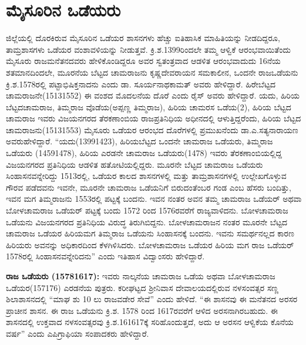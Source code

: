 \section*{ಮೈಸೂರಿನ ಒಡೆಯರು}

ಜಿಲ್ಲೆಯಲ್ಲಿ ದೊರಕಿರುವ ಮೈಸೂರಿನ ಒಡೆಯರ ಶಾಸನಗಳು ಹೆಚ್ಚು ಐತಿಹಾಸಿಕ ಮಾಹಿತಿಯನ್ನು ನೀಡದಿದ್ದರೂ, ತಾಮ್ರಶಾಸಗಳು ಒಡೆಯರ ವಂಶಾವಳಿಯನ್ನು ನೀಡುತ್ತವೆ. ಕ್ರಿ.ಶ.1399ರಿಂದಲೇ ತಮ್ಮ ಆಳ್ವಿಕೆ ಆರಂಭವಾಯಿತೆಂದು ಮೈಸೂರು ರಾಜಮನೆತನ\-ದವರು ಹೇಳಿಕೊಂಡಿದ್ದರೂ ಅವರ ಸ್ವತಂತ್ರವಾದ ಆಡಳಿತ ಆರಂಭವಾದುದು 16ನೆಯ ಶತಮಾನದಿಂದಲೇ, ಮೂರನೆಯ ಬೆಟ್ಟದ ಚಾಮರಾಜನು ಕೃಷ್ಣದೇವರಾಯನ ಸಮಕಾಲೀನ, ಒಂದನೇ ರಾಜಒಡೆಯನು ಕ್ರಿ.ಶ.1578ರಲ್ಲಿ ಪಟ್ಟಾಭಿಷಿಕ್ತನಾದನು ಎಂದು ಡಾ. ಸೂರ್ಯನಾಥಕಾಮತ್​ ಅವರು ಹೇಳಿದ್ದಾರೆ. ಹಿರೇಬೆಟ್ಟದ ಚಾಮರಾಜನೇ(1513\enginline{-}1552) ಈ ವಂಶದ ಮೊದಲನೆಯ ದೊರೆ ಎಂದು ರೈಸ್​ ಅವರು ಹೇಳಿದ್ದಾರೆ. ಯದು, ಹಿರಿಯ ಬೆಟ್ಟದಚಾಮರಾಜ, ತಿಮ್ಮರಾಜ ವೊಡೆಯ(ಅಪ್ಪಣ್ಣ ತಿಮ್ಮರಾಜ), ಹಿರಿಯ ಚಾಮರಸ ಒಡೆಯ(2), ಹಿರಿಯ ಬೆಟ್ಟದ ಚಾಮರಾಜ ಇವರು ವಿಜಯನಗರದ ತೆರಕಣಾಂಬಿಯ ರಾಜಪ್ರತಿನಿಧಿಯ ಅಧೀನದಲ್ಲಿ ಆಳುತ್ತಿದ್ದರೆಂದು, ಹಿರಿಯ ಬೆಟ್ಟದ ಚಾಮರಾಜನು\break (1513\enginline{-}1553) ಮೈಸೂರು ಒಡೆಯರ ಆರಂಭದ ದೊರೆಗಳಲ್ಲಿ ಪ್ರಮುಖನೆಂದು ಡಾ.ಎ.ಸತ್ಯನಾರಾಯಣ ಅವರು\break ಹೇಳಿದ್ದಾರೆ. “ಯದು(1399\enginline{-}1423), ಹಿರಿಯಬೆಟ್ಟದ ಒಂದನೇ ಚಾಮರಾಜ ಒಡೆಯರು, ತಿಮ್ಮರಾಜ ಒಡೆಯರು (1459\enginline{-}1478), ಹಿರಿಯ ಎರಡನೇ ಚಾಮರಾಜ ಒಡೆಯರು(1478) ಇವರು ತೆರಕಣಾಂಬಿಯಲ್ಲಿದ್ದ ವಿಜಯನಗರದ ಪ್ರತಿನಿಧಿಯ ಆಡಳಿತ ಹತೋಟಿಯಲ್ಲಿದ್ದರು. ಮೂರನೇ ಬೆಟ್ಟದ ಚಾಮರಾಜ ಒಡೆಯರು ಸಿಂಹಾಸನವನ್ನೇರಿದ್ದು 1513ರಲ್ಲಿ, ಒಡೆಯರ ಕಾಲದ ಶಾಸನಗಳಲ್ಲಿ ಮತ್ತು ತಾಮ್ರಶಾಸನಗಳಲ್ಲಿ ಉಲ್ಲೇಖಗೊಳ್ಳುವ ಗೌರವ ಪಡೆದವನು ಇವನೇ, ಮೂರನೇ ಚಾಮರಾಜ ಒಡೆಯನಿಗೆ ಬಿರುದಂತೆಂಬರ ಗಂಡ ಎಂಬ ಹೆಸರು ಬಂದಿತ್ತು, ಇವನ ಮಗ ತಿಮ್ಮರಾಜನು 1553ರಲ್ಲಿ ಪಟ್ಟಕ್ಕೆ ಬಂದನು. ಇವನ ನಂತರ ಅವನ ತಮ್ಮ ಚಾಮರಾಜ ಒಡೆಯರ್​ ಅಥವಾ ಬೋಳಚಾಮರಾಜ ಒಡೆಯರ್​ ಪಟ್ಟಕ್ಕೆ ಬಂದು 1572 ರಿಂದ 1576ರವರೆಗೆ ರಾಜ್ಯವಾಳಿದನು. ಬೋಳಚಾಮರಾಜ ಒಡೆಯನು ವಿಜಯನಗರದ ಪ್ರತಿನಿಧಿಯ ವಿರುದ್ಧ ತಿರುಗಿಬಿದ್ದನು. ಬೋಳಚಾಮರಾಜನ ನಂತರ ಮೂರನೇ ಬೆಟ್ಟದ ಚಾಮರಾಜ ಒಡೆಯರ ಹಿರಿಯಮಗ ತಿಮ್ಮರಾಜ ಒಡೆಯನು ಸಿಂಹಾಸನಕ್ಕೆ ಬಂದನು. ಇವನು ಸಮರ್ಥನಲ್ಲದ ಕಾರಣ ಹಿರಿಯರು ಅವನನ್ನು ಅಧಿಕಾರದಿಂದ ಕೆಳಗಿಳಿಸಿದರು. ಬೋಳಚಾಮರಾಜ ಒಡೆಯರ ಹಿರಿಯ ಮಗ ರಾಜ ಒಡೆಯರ್​ 1578ರಲ್ಲಿ ಸಿಂಹಾಸನವನ್ನೇರಿದನು” ಎಂದು ಇತಿಹಾಸ ವಿದ್ವಾಂಸರು ಹೇಳಿದ್ದಾರೆ.

\textbf{ರಾಜ ಒಡೆಯರು (1578\general{\enginline{-}}1617): } ಇವರು ನಾಲ್ಕನೆಯ ಚಾಮರಾಜ ಒಡೆಯ ಅಥವಾ ಬೋಳಚಾಮರಾಜ ಒಡೆಯರ(1571\enginline{-}76) ಎರಡನೆಯ ಪುತ್ರರು. ಕರೀಘಟ್ಟದ ಶ‍್ರೀನಿವಾಸ ದೇವಾಲಯದಲ್ಲಿರುವ ನಳಸಂವತ್ಸರ ಸಣ್ಣ ಶಿಲಾಶಾಸನದಲ್ಲಿ “ಮಾಘ ಶು 10 ಲು ರಾಜವಡೇರ ಸೇವೆ” ಎಂದು ಹೇಳಿದೆ. “ಈ ಶಾಸನವು ಈ ಮನೆತನದ ಅರಸರ ಪ್ರಾಚೀನ ಶಾಸನ. ಈ ರಾಜ ಒಡೆಯನು ಕ್ರಿ.ಶ. 1578 ರಿಂದ 1617ರವರೆಗೆ ಆಳಿದ ಅರಸನಾಗಿರಬಹುದು. ಈ ಶಾಸನದಲ್ಲಿ ಉಕ್ತವಾದ ನಳಸಂವತ್ಸರವು ಕ್ರಿ.ಶ.1616\enginline{-}17ಕ್ಕೆ ಸರಿಹೊಂದುತ್ತದೆ, ಅದು ಆ ಅರಸನ ಆಳ್ವಿಕೆಯ ಕೊನೆಯ ವರ್ಷ” ಎಂದು ಎಪಿಗ್ರಾಫಿಯಾ ಸಂಪಾದಕರು ಹೇಳಿದ್ದಾರೆ.

